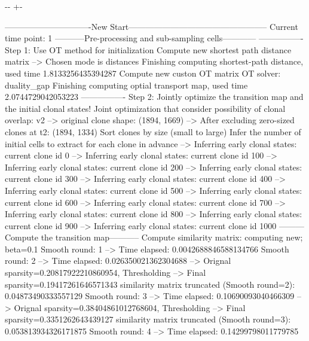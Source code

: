 \documentclass[letterpaper,10pt,english]{sphinxmanual}
\newlength\nbsphinxcodecellspacing
\begin{document}
{

\kern-\sphinxverbatimsmallskipamount\kern-\baselineskip
\kern+\FrameHeightAdjust\kern-\fboxrule
\vspace{\nbsphinxcodecellspacing}

\begin{sphinxVerbatim}[commandchars=\\\{\}]
-------------------------------New Start--------------------------------------------------
Current time point: 1
-----------Pre-processing and sub-sampling cells------------
----------------
Step 1: Use OT method for initialization
Compute new shortest path distance matrix
--> Chosen mode is distances
Finishing computing shortest-path distance, used time 1.8133256435394287
Compute new custon OT matrix
OT solver: duality\_gap
Finishing computing optial transport map, used time 2.0744729042053223
----------------
Step 2: Jointly optimize the transition map and the initial clonal states!
Joint optimization that consider possibility of clonal overlap: v2
--> original clone shape: (1894, 1669)
--> After excluding zero-sized clones at t2: (1894, 1334)
Sort clones by size (small to large)
Infer the number of initial cells to extract for each clone in advance
--> Inferring early clonal states: current clone id 0
--> Inferring early clonal states: current clone id 100
--> Inferring early clonal states: current clone id 200
--> Inferring early clonal states: current clone id 300
--> Inferring early clonal states: current clone id 400
--> Inferring early clonal states: current clone id 500
--> Inferring early clonal states: current clone id 600
--> Inferring early clonal states: current clone id 700
--> Inferring early clonal states: current clone id 800
--> Inferring early clonal states: current clone id 900
--> Inferring early clonal states: current clone id 1000
---------Compute the transition map-----------
Compute similarity matrix: computing new; beta=0.1
Smooth round: 1
--> Time elapsed: 0.0042688846588134766
Smooth round: 2
--> Time elapsed: 0.026350021362304688
--> Orignal sparsity=0.20817922210860954, Thresholding
--> Final sparsity=0.19417261646571343
similarity matrix truncated (Smooth round=2):  0.04873490333557129
Smooth round: 3
--> Time elapsed: 0.10690093040466309
--> Orignal sparsity=0.38404861012768604, Thresholding
--> Final sparsity=0.3351262643439127
similarity matrix truncated (Smooth round=3):  0.053813934326171875
Smooth round: 4
--> Time elapsed: 0.14299798011779785

\end{sphinxVerbatim}}
\end{document}
